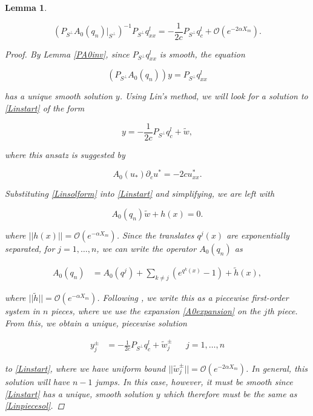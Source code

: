 \documentclass[12pt]{article}
\newtheorem{lemma}{Lemma}
\begin{document}
\begin{lemma}\label{PA0invqxx}

\begin{equation}\label{invqxx}
(P_{S^\perp} A_0(q_n)|_{S^\perp})^{-1} P_{S^\perp} q^l_{xx} = -\frac{1}{2c}P_{S^\perp} q^l_c
+ \mathcal{O}(e^{-2 \alpha X_m}).
\end{equation}

\begin{proof}
By Lemma \ref{PA0inv}, since $P_{S^\perp} q^l_{xx}$ is smooth, the equation

\begin{equation}\label{Linstart}
(P_{S^\perp} A_0(q_n))y = P_{S^\perp} q^l_{xx}
\end{equation}

has a unique smooth solution $y$. Using Lin's method, we will look for a solution to \eqref{Linstart} of the form 

\begin{equation}\label{Linsolform}
y = -\frac{1}{2c} P_{S^\perp} q^l_c + \tilde{w},
\end{equation}

where this ansatz is suggested by 

\begin{equation}\label{uc}
A_0(u_*) \partial_c u^* = -2 c u^*_{xx}.
\end{equation}

Substituting \eqref{Linsolform} into \eqref{Linstart} and simplifying, we are left with

\begin{equation}
A_0(q_n)\tilde{w} + h(x) = 0.
\end{equation}

where $||h(x)|| = \mathcal{O}(e^{-\alpha X_m})$. Since the translates $q^j(x)$ are exponentially separated, for $j = 1, \dots, n$, we can write the operator $A_0(q_n)$ as 

\begin{align}\label{A0expansion} 
A_0(q_n) &= A_0(q^j) + \sum_{k \neq j} (e^{q^k(x)} - 1) + \tilde{h}(x),
\end{align}

where $||\tilde{h}|| = \mathcal{O}(e^{-\alpha X_m})$. Following \cite{Sandstede1998}, we write this as a piecewise first-order system in $n$ pieces, where we use the expansion \eqref{A0expansion} on the $j$th piece. From this, we obtain a unique, piecewise solution 

\begin{align}\label{Linpiecesol}
y_j^\pm &= -\frac{1}{2c} P_{S^\perp} q^l_c + \tilde{w}_j^\pm && j = 1, \dots, n
\end{align}

to \eqref{Linstart}, where we have uniform bound $||\tilde{w}_j^\pm|| = \mathcal{O}(e^{-2 \alpha X_m})$. In general, this solution will have $n - 1$ jumps. In this case, however, it must be smooth since \eqref{Linstart} has a unique, smooth solution $y$ which therefore must be the same as \eqref{Linpiecesol}. 

\end{proof}
\end{lemma}
\end{document}
